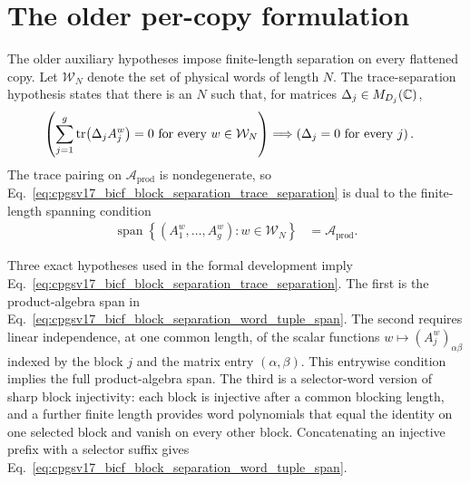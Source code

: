 \documentclass{article}
\begin{document}
\section{The older per-copy formulation}

The older auxiliary hypotheses impose finite-length separation on every
flattened copy. Let $\mathcal W_N$ denote the set of physical words of length
$N$. The trace-separation hypothesis states that there is an $N$ such that,
for matrices $\Delta_j\in M_{D_j}(\mathbb{C})$,
\begin{align}
    \left(\sum_{j=1}^{g}\operatorname{tr}\!\left(\Delta_j A_j^w\right)=0
        \text{ for every }w\in\mathcal W_N\right)
    &\Longrightarrow
    \left(\Delta_j=0\text{ for every }j\right).
    \label{eq:cpgsv17_bicf_block_separation_trace_separation}
\end{align}
The trace pairing on $\mathcal A_{\mathrm{prod}}$ is nondegenerate, so
Eq.~\ref{eq:cpgsv17_bicf_block_separation_trace_separation} is dual to the
finite-length spanning condition
\begin{align}
    \operatorname{span}
    \left\{\left(A_1^w,\ldots,A_g^w\right)
        : w\in\mathcal W_N\right\}
    &= \mathcal A_{\mathrm{prod}}.
    \label{eq:cpgsv17_bicf_block_separation_word_tuple_span}
\end{align}

Three exact hypotheses used in the formal development imply
Eq.~\ref{eq:cpgsv17_bicf_block_separation_trace_separation}. The first is the
product-algebra span in
Eq.~\ref{eq:cpgsv17_bicf_block_separation_word_tuple_span}. The second requires
linear independence, at one common length, of the scalar functions
$w\mapsto(A_j^w)_{\alpha\beta}$ indexed by the block $j$ and the matrix entry
$(\alpha,\beta)$. This entrywise condition implies the full product-algebra
span. The third is a selector-word version of sharp block injectivity: each
block is injective after a common blocking length, and a further finite length
provides word polynomials that equal the identity on one selected block and
vanish on every other block. Concatenating an injective prefix with a selector
suffix gives Eq.~\ref{eq:cpgsv17_bicf_block_separation_word_tuple_span}.
\end{document}
